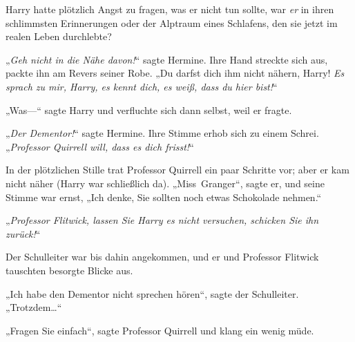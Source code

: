 Harry hatte plötzlich Angst zu fragen, was er nicht tun sollte, war \emph{er} in ihren schlimmsten Erinnerungen oder der Alptraum eines Schlafens, den sie jetzt im realen Leben durchlebte?

„\emph{Geh nicht in die Nähe davon!}“ sagte Hermine. Ihre Hand streckte sich aus, packte ihn am Revers seiner Robe. „Du darfst dich ihm nicht nähern, Harry! \emph{Es sprach zu mir, Harry, es kennt dich, es weiß, dass du hier bist!}“

„Was—“ sagte Harry und verfluchte sich dann selbst, weil er fragte.

„\emph{Der Dementor!}“ sagte Hermine. Ihre Stimme erhob sich zu einem Schrei. „\emph{Professor Quirrell will, dass es dich frisst!}“

In der plötzlichen Stille trat Professor Quirrell ein paar Schritte vor; aber er kam nicht näher (Harry war schließlich da). „Miss~Granger“, sagte er, und seine Stimme war ernst, „Ich denke, Sie sollten noch etwas Schokolade nehmen.“

„\emph{Professor Flitwick, lassen Sie Harry es nicht versuchen, schicken Sie ihn zurück!}“

Der Schulleiter war bis dahin angekommen, und er und Professor Flitwick tauschten besorgte Blicke aus.

„Ich habe den Dementor nicht sprechen hören“, sagte der Schulleiter. „Trotzdem…“

„Fragen Sie einfach“, sagte Professor Quirrell und klang ein wenig müde.

